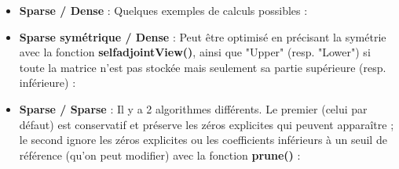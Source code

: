 \documentclass[11pt]{article}
\begin{document}
\noindent
\begin{itemize}

	\item \textbf{Sparse / Dense} : Quelques exemples de calculs possibles :

\vspace{5 mm}	
	
\begin{center}
\end{center}

\vspace{5 mm}

	\item \textbf{Sparse symétrique / Dense} : Peut être optimisé en précisant la symétrie avec la fonction \textbf{selfadjointView()}, ainsi que "Upper" (resp. "Lower") si toute la matrice n'est pas stockée mais seulement sa partie supérieure (resp. inférieure) :

\vspace{5 mm}	
	
\begin{center}
\end{center}

\vspace{5 mm}
	
	\item \textbf{Sparse / Sparse} : Il y a 2 algorithmes différents. Le premier (celui par défaut) est conservatif et préserve les zéros explicites qui peuvent apparaître ; le second ignore les zéros explicites ou les coefficients inférieurs à un seuil de référence (qu'on peut modifier) avec la fonction \textbf{prune()} :

\vspace{5 mm}	
	
\begin{center}
\end{center}


\end{itemize}
\end{document}
